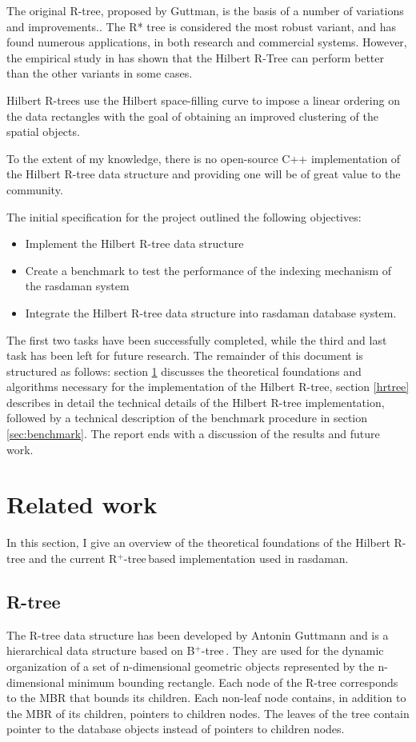 \documentclass[11pt, a4paper, oneside]{article}
\newcommand{\rplus}{R$^+$-tree$\,$}
\newcommand{\bplus}{B$^+$-tree$\,$}
\begin{document}
The original R-tree, proposed by Guttman, is the basis of a number of variations and improvements.. The R* tree is considered the most robust variant, and has found numerous applications, in both research and commercial systems. However, the empirical study in  has shown that the Hilbert R-Tree can perform better than the other variants in some cases.

Hilbert R-trees use the Hilbert space-filling curve to impose a linear ordering on the data rectangles with the goal of obtaining an improved clustering of the spatial objects.

To the extent of my knowledge, there is no open-source C++ implementation of the Hilbert R-tree data structure and providing one will be of great value to the community.

The initial specification for the project outlined the following objectives:
\begin{itemize}
\item Implement the Hilbert R-tree data structure
\item Create a benchmark to test the performance of the indexing mechanism of the rasdaman system
\item Integrate the Hilbert R-tree data structure into rasdaman database system.
\end{itemize}

The first two tasks have been successfully completed, while the third and last task has been left for future research.
The remainder of this document is structured as follows: section \ref{sec:related} discusses the theoretical foundations and algorithms necessary for the implementation of the Hilbert R-tree, section \ref{hrtree} describes in detail the technical details of the Hilbert R-tree implementation, followed by a technical description of the benchmark procedure in section \ref{sec:benchmark}.
The report ends with a discussion of the results and future work.

\section{Related work}
\label{sec:related}

In this section, I give an overview of the theoretical foundations of the Hilbert R-tree and the current \rplus based implementation used in rasdaman.

\subsection{R-tree}
The R-tree data structure has been developed by Antonin Guttmann  and is a hierarchical data structure based on \bplus. They are used for the dynamic organization of a set of n-dimensional geometric objects represented by the n-dimensional minimum bounding rectangle. Each node of the R-tree corresponds to the MBR that bounds its children. Each non-leaf node contains, in addition to the MBR of its children, pointers to children nodes. The leaves of the tree contain pointer to the database objects instead of pointers to children nodes.
\end{document}
